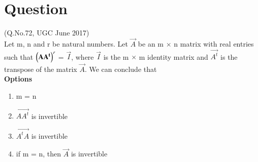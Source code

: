 \documentclass[journal,12pt,twocolumn]{IEEEtran}
\begin{document}
\section*{\textbf{Question}}
(Q.No.72, UGC June 2017)\\
Let m, n and r be natural numbers. Let $\vec{A}$ be an m $\times$ n matrix with real entries such that $\left(\mathbf{AA^t}\right)^r$ = $\vec{I}$, where $\vec{I}$ is the m $\times$ m identity matrix and $\vec{A^t}$ is the transpose of the matrix $\vec{A}$. We can conclude that\\
\textbf{Options}
\begin{enumerate}
\item m = n
\item $\vec{AA^t}$ is invertible
\item $\vec{A^tA}$ is invertible
\item if m = n, then $\vec{A}$ is invertible
\end{enumerate}
\end{document}
